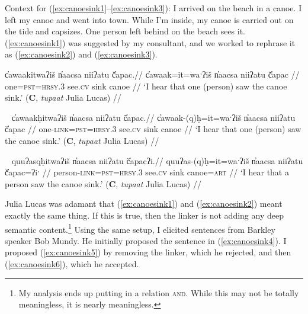 \vspace{5pt}

\noindent Context for (\ref{ex:canoesink1}--\ref{ex:canoesink3}): I arrived on the beach in a canoe. I left my canoe and went into town. While I'm inside, my canoe is carried out on the tide and capsizes. One person left behind on the beach sees it. (\ref{ex:canoesink1}) was suggested by my consultant, and we worked to rephrase it as (\ref{ex:canoesink2}) and (\ref{ex:canoesink3}).

\ex \label{ex:canoesink1}
\begingl
\glpreamble c̓awaakitwaʔiš n̓aacsa niiʔatu č̓apac.//
\gla c̓awaak=it=waˑʔiš n̓aacsa niiʔatu č̓apac //
\glb one=\textsc{pst}=\textsc{hrsy.3} see.\textsc{cv} sink canoe //
\glft `I hear that one (person) saw the canoe sink.' (\textbf{C}, \textit{tupaat} Julia Lucas) //
\endgl
\xe

\ex~ \label{ex:canoesink2}
\begingl
\glpreamble c̓awaakḥitwaʔiš n̓aacsa niiʔatu č̓apac.//
\gla c̓awaak-(q)ḥ=it=waˑʔiš n̓aacsa niiʔatu č̓apac //
\glb one-\textsc{link}=\textsc{pst}=\textsc{hrsy.3} see.\textsc{cv} sink canoe //
\glft `I hear that one (person) saw the canoe sink.' (\textbf{C}, \textit{tupaat} Julia Lucas) //
\endgl
\xe

\ex~ \label{ex:canoesink3}
\begingl
\glpreamble quuʔasqḥitwaʔiš n̓aacsa niiʔatu č̓apacʔi.//
\gla quuʔas-(q)ḥ=it=waˑʔiš n̓aacsa niiʔatu č̓apac=ʔiˑ //
\glb person-\textsc{link}=\textsc{pst}=\textsc{hrsy.3} see.\textsc{cv} sink canoe=\textsc{art} //
\glft `I hear that a person saw the canoe sink.' (\textbf{C}, \textit{tupaat} Julia Lucas) //
\endgl
\xe




Julia Lucas was adamant that (\ref{ex:canoesink1}) and (\ref{ex:canoesink2}) meant exactly the same thing. If this is true, then the linker is not adding any deep semantic content.\footnote{My analysis ends up putting in a relation \textsc{and}. While this may not be totally meaningless, it is nearly	 meaningless.} Using the same setup, I elicited sentences from Barkley speaker Bob Mundy. He initially proposed the sentence in (\ref{ex:canoesink4}). I proposed (\ref{ex:canoesink5}) by removing the linker, which he rejected, and then (\ref{ex:canoesink6}), which he accepted.

